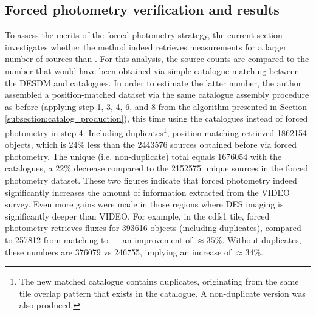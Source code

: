  
 
\subsection{Forced photometry verification and results}\label{subsection:forced_phot_verification}
To assess the merits of the \DESVIDEO forced photometry strategy, the current section investigates whether the \DESVIDEO method indeed retrieves measurements for a larger number of sources than  \cite{2013MNRAS.428.1281J}. For this analysis, the \DESVIDEO source counts are compared to the number that would have been obtained via simple catalogue matching between the DESDM and \cite{2013MNRAS.428.1281J} catalogues. In order to estimate the latter number, the author assembled a position-matched dataset via the same catalogue assembly procedure as before (applying step 1, 3, 4, 6, and 8 from the algorithm presented in Section \ref{subsection:catalog_production}), this time using the \cite{2013MNRAS.428.1281J} catalogues instead of \DESVIDEO forced photometry in step 4. Including duplicates\footnote{The new matched catalogue contains duplicates, originating from the same tile overlap pattern that exists in the \DESVIDEO catalogue. A non-duplicate version was also produced.}, position matching retrieved \num{1 862 154} objects, which is 24\% less than the \num{2 443 576} sources obtained before via forced photometry. The unique (i.e. non-duplicate) total equals \num{1 676 054} with the \cite{2013MNRAS.428.1281J} catalogues, a 22\% decrease compared to the \num{2 152 575} unique sources in the forced photometry dataset. These two figures indicate that \DESVIDEO forced photometry indeed significantly increases the amount of information extracted from the VIDEO survey. Even more gains were made in those regions where DES imaging is significantly deeper than VIDEO. For example, in the cdfs1 tile, forced photometry retrieves fluxes for \num{393616} objects (including duplicates), compared to \num{257812} from matching to \cite{2013MNRAS.428.1281J} ---  an improvement of $\approx 35\%$. Without duplicates, these numbers are \num{376079} vs \num{246755}, implying an increase of $\approx 34\%$. \par


